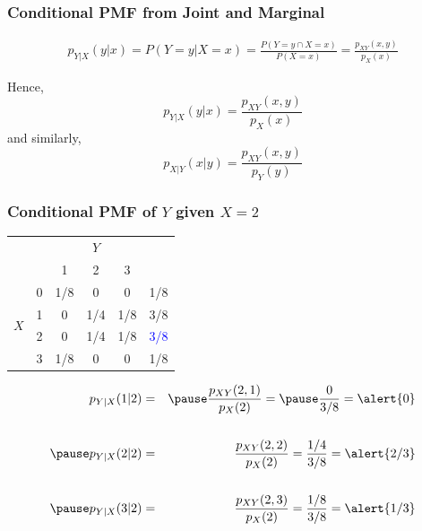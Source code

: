 \documentclass[handout]{beamer}
\begin{document}
\begin{frame}
\frametitle{Conditional PMF from Joint and Marginal}

\begin{eqnarray*}
	p_{Y|X}(y|x) = P(Y=y|X=x) =  \frac{P(Y=y \cap X=x)}{P(X=x)} =  \frac{p_{XY}(x,y)}{p_X(x)}
\end{eqnarray*}
\vspace{1em}

Hence,
 $$\boxed{p_{Y|X}(y|x) = \frac{p_{XY}(x,y)}{p_X(x)}}$$
 and similarly,
  $$\boxed{p_{X|Y}(x|y) = \frac{p_{XY}(x,y)}{p_Y(y)}}$$

\end{frame}


\begin{frame}
\frametitle{Conditional PMF of $Y$ given $X = 2$}

\begin{table}
\begin{tabular}{|cc|ccc|c|}
\hline
&&\multicolumn{3}{c|}{$Y$}&\\
&&1 & 2&3&\\
\hline
\multirow{4}{*}{$X$}
&0& \multicolumn{1}{|c}{1/8} & 0& 0&1/8\\
&1& \multicolumn{1}{|c}{0} & 1/4&1/8&3/8\\
&2& \multicolumn{1}{|c}{\alert{0}} & \alert{1/4}&\alert{1/8}&\textcolor{blue}{3/8}\\
&3& \multicolumn{1}{|c}{1/8} & 0&0&1/8\\
\hline
\end{tabular}
\end{table}

\begin{eqnarray*}
	p_{Y|X}(1|2) &=&\pause \frac{p_{XY}(2,1)}{p_X(2)} =\pause \frac{0}{3/8} =\alert{0}\\ \\ \pause
	p_{Y|X}(2|2) &=&\frac{p_{XY}(2,2)}{p_X(2)}= \frac{1/4}{3/8} =\alert{2/3} \\ \\ \pause
	 p_{Y|X}(3|2) &=&\frac{p_{XY}(2,3)}{p_X(2)} = \frac{1/8}{3/8} = \alert{1/3}
\end{eqnarray*}


\end{frame}
\end{document}
